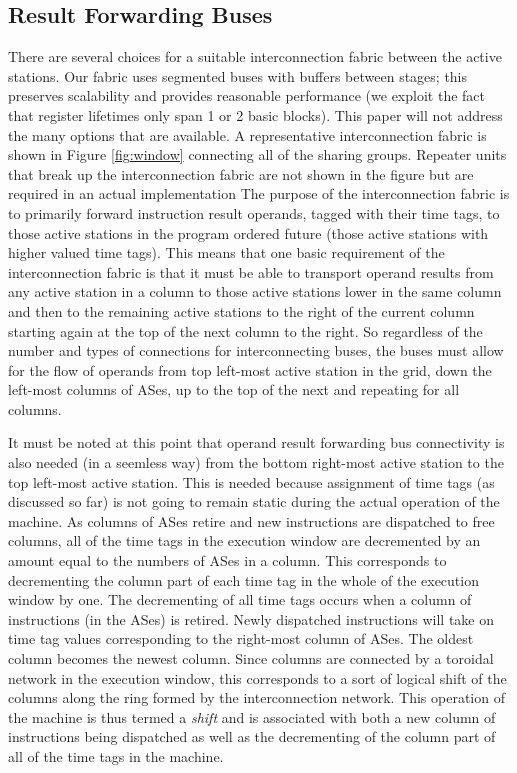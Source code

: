 \documentclass[10pt,dvips]{article}
\begin{document}
\subsection{Result Forwarding Buses}
%
There are several choices for a suitable interconnection fabric between
the active stations.  Our fabric uses segmented buses with buffers
between stages; this preserves
scalability and provides reasonable performance (we exploit the fact
that register lifetimes only span 1 or 2 basic blocks).
This paper will not address the
many options that are available.  
A representative interconnection fabric is shown in Figure \ref{fig:window}
connecting all of the sharing groups.
Repeater units that break up the interconnection fabric are not
shown in the figure but are required in an actual implementation
The purpose of the
interconnection fabric is to primarily forward instruction result
operands, tagged with their time tags, 
to those active stations in the program ordered future (those
active stations with higher valued time tags).  This means that one
basic requirement of the interconnection fabric is that it must be able
to transport operand results from any active station in a column to
those active stations lower in the same column and then to the remaining
active stations to the right of the current column starting again at
the top of the next column to the right.  So regardless of the number
and types of connections for interconnecting buses, the buses must
allow for the flow of operands from top left-most active station in the
grid, down the left-most columns of ASes, up to the top of the next and
repeating for all columns.

It must be noted at this point that operand result forwarding
bus connectivity is also needed (in a seemless way) from the bottom
right-most active station to the top left-most active station.
This is needed because assignment of time tags (as discussed so far)
is not going to remain static during the actual operation of the machine.
As columns of ASes retire and new instructions are dispatched to
free columns,
all of the time tags in the execution window are decremented by
an amount equal to the numbers of ASes in a column.  This corresponds
to decrementing the column part of each time tag in the whole of the
execution window by one.  The decrementing of all time tags
occurs when a column of instructions (in the ASes) is retired.
Newly dispatched instructions will take on
time tag values corresponding to the right-most 
column of ASes.  The oldest column becomes the 
newest column.  Since columns are connected by a toroidal network in the
execution window, this corresponds to a sort of logical shift
of the columns along the ring formed by the interconnection
network.  This operation of the machine is thus termed a \textit{shift}
and is associated with both a new column of instructions being dispatched
as well as the decrementing of the column part of all of the time tags
in the machine.
%
%
\end{document}
